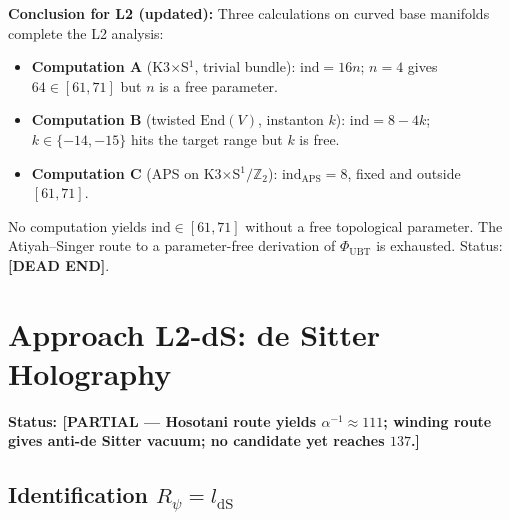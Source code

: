 \documentclass[11pt,a4paper]{article}
\theoremstyle{definition}
\theoremstyle{remark}
\begin{document}
\textbf{Conclusion for L2 (updated):}
Three calculations on curved base manifolds complete the L2 analysis:
\begin{itemize}
  \item \textbf{Computation A} (K3$\times$S$^1$, trivial bundle):
        $\mathrm{ind}=16n$; $n=4$ gives $64\in[61,71]$ but $n$ is a free parameter.
  \item \textbf{Computation B} (twisted $\mathrm{End}(V)$, instanton $k$):
        $\mathrm{ind}=8-4k$; $k\in\{-14,-15\}$ hits the target range but $k$ is free.
  \item \textbf{Computation C} (APS on K3$\times$S$^1/\mathbb{Z}_2$):
        $\mathrm{ind}_{\mathrm{APS}}=8$, fixed and outside $[61,71]$.
\end{itemize}
No computation yields $\mathrm{ind}\in[61,71]$ without a free topological
parameter.  The Atiyah--Singer route to a parameter-free derivation of
$\Phi_{\mathrm{UBT}}$ is exhausted.
Status: \textbf{[DEAD END]}.

\section{Approach L2-dS: de Sitter Holography}
\label{sec:L2_dS}

\textbf{Status: [PARTIAL --- Hosotani route yields $\alpha^{-1}\approx 111$;
winding route gives anti-de Sitter vacuum; no candidate yet reaches $137$.]}

\subsection{Identification $R_\psi = l_{\mathrm{dS}}$}
\label{subsec:L2dS_identification}
\end{document}
